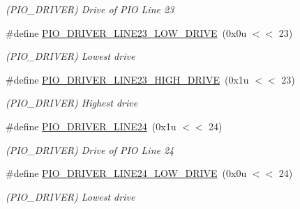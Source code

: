 \begin{DoxyCompactItemize}
\begin{DoxyCompactList}\small\item\em (P\+I\+O\+\_\+\+D\+R\+I\+V\+ER) Drive of P\+IO Line 23 \end{DoxyCompactList}\item 
\mbox{\label{group__SAMS70__PIO_ga2b8e47adf8d2fcbdc36cda27be4ea6c1}} 
\#define \mbox{\hyperlink{group__SAMS70__PIO_ga2b8e47adf8d2fcbdc36cda27be4ea6c1}{P\+I\+O\+\_\+\+D\+R\+I\+V\+E\+R\+\_\+\+L\+I\+N\+E23\+\_\+\+L\+O\+W\+\_\+\+D\+R\+I\+VE}}~(0x0u $<$$<$ 23)
\begin{DoxyCompactList}\small\item\em (P\+I\+O\+\_\+\+D\+R\+I\+V\+ER) Lowest drive \end{DoxyCompactList}\item 
\mbox{\label{group__SAMS70__PIO_ga196410dea1d03933d7c7f824de9f3517}} 
\#define \mbox{\hyperlink{group__SAMS70__PIO_ga196410dea1d03933d7c7f824de9f3517}{P\+I\+O\+\_\+\+D\+R\+I\+V\+E\+R\+\_\+\+L\+I\+N\+E23\+\_\+\+H\+I\+G\+H\+\_\+\+D\+R\+I\+VE}}~(0x1u $<$$<$ 23)
\begin{DoxyCompactList}\small\item\em (P\+I\+O\+\_\+\+D\+R\+I\+V\+ER) Highest drive \end{DoxyCompactList}\item 
\mbox{\label{group__SAMS70__PIO_ga5afc8b6ebba796c7667dbedf3c78ebfe}} 
\#define \mbox{\hyperlink{group__SAMS70__PIO_ga5afc8b6ebba796c7667dbedf3c78ebfe}{P\+I\+O\+\_\+\+D\+R\+I\+V\+E\+R\+\_\+\+L\+I\+N\+E24}}~(0x1u $<$$<$ 24)
\begin{DoxyCompactList}\small\item\em (P\+I\+O\+\_\+\+D\+R\+I\+V\+ER) Drive of P\+IO Line 24 \end{DoxyCompactList}\item 
\mbox{\label{group__SAMS70__PIO_ga4928c9718ac79982184ebeb7899f1a6e}} 
\#define \mbox{\hyperlink{group__SAMS70__PIO_ga4928c9718ac79982184ebeb7899f1a6e}{P\+I\+O\+\_\+\+D\+R\+I\+V\+E\+R\+\_\+\+L\+I\+N\+E24\+\_\+\+L\+O\+W\+\_\+\+D\+R\+I\+VE}}~(0x0u $<$$<$ 24)
\begin{DoxyCompactList}\small\item\em (P\+I\+O\+\_\+\+D\+R\+I\+V\+ER) Lowest drive \end{DoxyCompactList}\item 

\end{DoxyCompactItemize}
